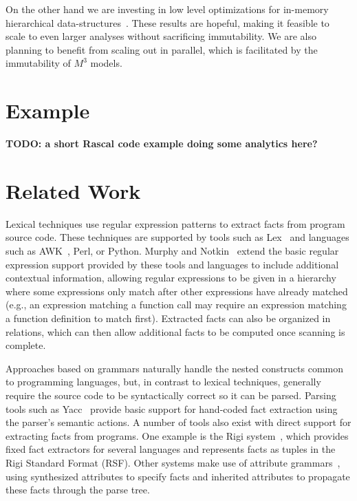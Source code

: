 \documentclass[conference]{IEEEtran}
\newcommand{\mthree}{\ensuremath{M^3}\xspace}
\begin{document}
On the other hand we are investing in low level optimizations for in-memory hierarchical data-structures~\cite{aterms,gpce,ecoop}. These results are hopeful, making it feasible to scale to even larger analyses without sacrificing immutability. We are also planning to benefit from scaling out in parallel, which is facilitated by the immutability of \mthree models. 

\section{Example}

\textbf{TODO: a short Rascal code example doing some analytics here?}

\section{Related Work}

Lexical techniques use regular expression patterns to extract facts from
program source code. These techniques are supported by tools such as Lex~\cite{Lex}
and languages such as AWK~\cite{AWK79}, Perl, or Python. Murphy and
Notkin~\cite{MurphyNotkin95,DBLP:journals/tosem/MurphyN96} extend the
basic regular expression support provided by these tools and languages
to include additional contextual information, allowing regular
expressions to be given in a hierarchy where some expressions only match after
other expressions have already matched (e.g., an expression matching a
function call may require an expression matching a function definition to
match first). Extracted facts can also be organized in relations, which can
then allow additional facts to be computed once scanning is complete.

Approaches based on grammars naturally handle the nested constructs common to
programming languages, but, in contrast to lexical techniques, generally
require the source code to be syntactically correct so it can be parsed.
Parsing tools such as Yacc~\cite{Yacc} provide basic support for hand-coded
fact extraction using the parser's semantic actions. A number of tools also
exist with direct support for extracting facts from programs. One example is
the Rigi system~\cite{Mueller88}, which provides fixed fact extractors for
several languages and represents facts as tuples in the Rigi Standard Format
(RSF). Other systems make use of attribute
grammars~\cite{FNC2,Paakki95,EkmanHedin07,kiama,DBLP:journals/scp/WykBGK10},
using synthesized attributes to specify facts and inherited attributes to
propagate these facts through the parse tree.
\end{document}
